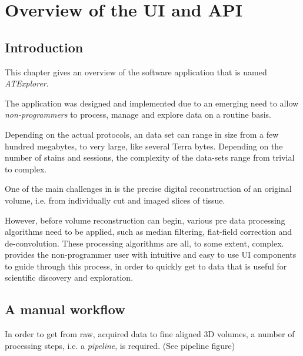 
\chapter{Overview of the \ate{} UI and API}
\section{Introduction}

\doublespacing
This chapter gives an overview of the software application that is named \emph{ATExplorer}.

The \ate application was designed and implemented due to an emerging need to allow \emph{non-programmers} to process, manage and explore \at data on a routine basis.

Depending on the actual protocols, an \at data set can range in size from a few hundred megabytes, to very large, like several Terra bytes.  Depending on the number of stains and sessions, the complexity of the data-sets range from trivial to complex.

One of the main challenges in \at is the precise digital reconstruction of an original volume, i.e. from individually cut and imaged slices of tissue.

However, before volume reconstruction can begin, various pre data processing algorithms need to be applied, such as median filtering, flat-field correction and de-convolution. These processing algorithms are all, to some extent, complex. \ate provides the non-programmer user with intuitive and easy to use UI components to guide through this process, in order to quickly get to data that is useful for scientific discovery and exploration.

\section{A manual \at workflow}
In order to get from raw, acquired data to  fine aligned 3D volumes, a number of processing steps, i.e. a \emph{pipeline}, is required. (See pipeline figure)

\begin{description}[font=$\bullet$~\normalfont\scshape\color{red!50!black}]
\item [FlatField correction]
\item [Deconvolution]
\item [Stitching]
\item [Registration]
\item [Rough aligning] 
\item [Fine aligning] 
\item [Other]
\end{description}

